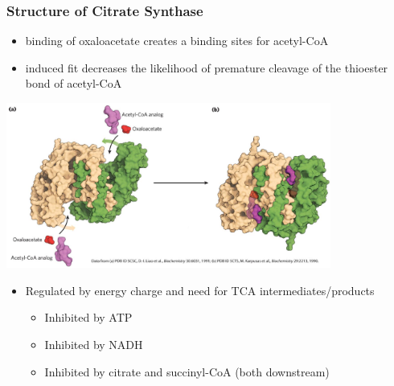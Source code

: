 \documentclass[10pt]{article}
\begin{document}
\subsubsection*{Structure of Citrate Synthase}
\begin{itemize}
	\item binding of oxaloacetate creates a binding sites for acetyl-CoA
	\item induced fit decreases the likelihood of premature cleavage of the thioester bond of acetyl-CoA
\end{itemize}
\begin{center} 
	\includegraphics*[width=0.8\textwidth]{L4_2.png}
\end{center}
\begin{itemize}
	\item Regulated by energy charge and need for TCA intermediates/products
	\begin{itemize}
        \item Inhibited by ATP
        \item Inhibited by NADH
        \item Inhibited by citrate and succinyl-CoA (both downstream)
    \end{itemize}
\end{itemize}
\end{document}
